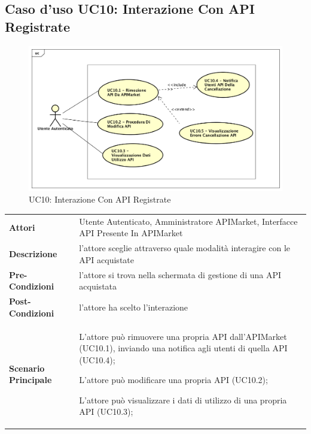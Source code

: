 \newpage
\subsection{Caso d'uso UC10: Interazione Con API Registrate}
\label{UC10}
\begin{figure}[ht]
	\centering
	\includegraphics[scale=0.45]{UML/UC10.png}
	\caption{UC10: Interazione Con API Registrate}
\end{figure}

\renewcommand*{\arraystretch}{1.6}
\begin{longtable}{ l | p{11cm}}
	\hline
	\rowcolor{Gray}
	\multicolumn{2}{c}{UC10: Interazione Con API Registrate} \\
	\hline
	\textbf{Attori} &Utente Autenticato, Amministratore APIMarket, Interfacce API Presente In APIMarket \\
	\textbf{Descrizione} & l'attore sceglie attraverso quale modalità interagire con le API acquistate \\
	\textbf{Pre-Condizioni} & l'attore si trova nella schermata di gestione di una API acquistata\\
	\textbf{Post-Condizioni}&l'attore ha scelto l'interazione\\
	\textbf{Scenario Principale} & \begin{enumerate*}[label=(\arabic*.),itemjoin={\newline}]
			\item L'attore può rimuovere una propria API dall'APIMarket (UC10.1), inviando una notifica agli utenti di quella API (UC10.4);
		\item L'attore può modificare una propria API (UC10.2);
		\item L'attore può visualizzare i dati di utilizzo di una propria API (UC10.3);
	\end{enumerate*}\\
\end{longtable}



